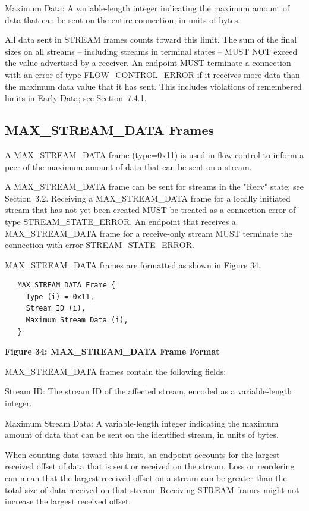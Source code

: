 \documentclass{article}
\begin{document}
Maximum Data:  A variable-length integer indicating the maximum amount of data that can be sent on the entire connection, in units of bytes.

All data sent in STREAM frames counts toward this limit.  The sum of the final sizes on all streams -- including streams in terminal states -- MUST NOT exceed the value advertised by a receiver.  An endpoint MUST terminate a connection with an error of type FLOW\_CONTROL\_ERROR if it receives more data than the maximum data value that it has sent.  This includes violations of remembered limits in Early Data; see Section~7.4.1.

\subsection{MAX\_STREAM\_DATA Frames}

A MAX\_STREAM\_DATA frame (type=0x11) is used in flow control to inform a peer of the maximum amount of data that can be sent on a stream.

A MAX\_STREAM\_DATA frame can be sent for streams in the "Recv" state; see Section~3.2.  Receiving a MAX\_STREAM\_DATA frame for a locally initiated stream that has not yet been created MUST be treated as a connection error of type STREAM\_STATE\_ERROR.  An endpoint that receives a MAX\_STREAM\_DATA frame for a receive-only stream MUST terminate the connection with error STREAM\_STATE\_ERROR.

MAX\_STREAM\_DATA frames are formatted as shown in Figure 34.

\begin{verbatim}
   MAX_STREAM_DATA Frame {
     Type (i) = 0x11,
     Stream ID (i),
     Maximum Stream Data (i),
   }
\end{verbatim}

\begin{center}
\textbf{Figure 34: MAX\_STREAM\_DATA Frame Format}
\end{center}

MAX\_STREAM\_DATA frames contain the following fields:

Stream ID:  The stream ID of the affected stream, encoded as a variable-length integer.

Maximum Stream Data:  A variable-length integer indicating the maximum amount of data that can be sent on the identified stream, in units of bytes.

When counting data toward this limit, an endpoint accounts for the largest received offset of data that is sent or received on the stream.  Loss or reordering can mean that the largest received offset on a stream can be greater than the total size of data received on that stream.  Receiving STREAM frames might not increase the largest received offset.
\end{document}
